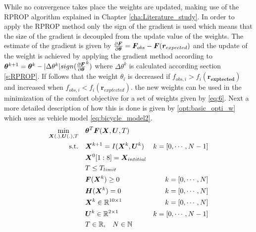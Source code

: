 While no convergence takes place the weights are updated, making use of the RPROP algorithm explained in Chapter \ref{cha:Literature_study}. In order to apply the RPROP method only the sign of the gradient is used which means that the size of the gradient is decoupled from the update value of the weights. The estimate of the gradient is given by $\pdv{\bm{F}}{\bm{\theta}} = \bm{F}_{obs} - \bm{F}(\bm{r}_{expected})$  and the update of the weight is achieved by applying the gradient method according to $\bm{\theta}^{k+1} = \bm{\theta}^{k} - |\Delta \theta^{k}|sign( \pdv{\bm{F}}{\bm{\theta}}^k )$ where $\Delta \theta^{k}$ is calculated according section \ref{s:RPROP}. If follows that the weight $\theta_i$ is decreased if $f_{obs,i}>f_{i}(\bm{r_{exptected}})$ and increased when $f_{obs,i}<f_{i}(\bm{r}_{exptected})$. the new weights can be used in the minimization of the comfort objective for a set of weights given by \ref{eq:6}. Next a more detailed description of how this is done is given by \ref{opt:basic_opti_w} which uses as vehicle model \ref{eq:bicycle_model2}. \\

\begin{equation}\label{opt:basic_opti_w}
\begin{aligned}
\min_{\bm{X}(.),\bm{U}(.), T} \quad &  \bm{\theta}^T\bm{F}(\bm{X},\bm{U}, T) \\
\textrm{s.t.} \quad & \bm{X}^{k+1} = I(\bm{X}^{k}, \bm{U}^{k}) & k = [0,\cdots, N-1]\\
& \bm{X}^{0}[1:8]= \bm{X}_{intitial} \\
& T \leq T_{limit}\\
& \bm{F}(\bm{X}^{k}) \geq 0	& k = [0,\cdots, N]\\
& \bm{H}(\bm{X}^{k}) = 0	& k = [0,\cdots, N]\\
& \bm{X}^{k}\in \mathbb{R}^{10\times 1}  & k = [0,\cdots, N]\\
& \bm{U}^{k}\in \mathbb{R}^{2\times 1} \hspace{3 mm} & k = [0,\cdots, N-1]\\
& T \in \mathbb{R},\hspace{3 mm} N \in \mathbb{N}
\end{aligned}
\end{equation}


